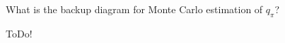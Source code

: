 
\begin{exercise}

What is the backup diagram for Monte Carlo estimation of $q_\pi$?

\end{exercise}


\begin{solution}

ToDo!

\end{solution}

